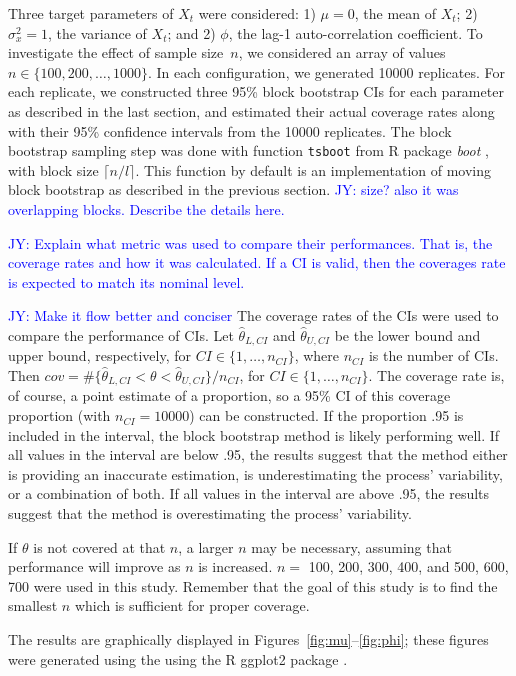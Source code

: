 \documentclass[12pt, letterpaper, titlepage]{article}
\newcommand{\jy}[1]{\textcolor{blue}{JY: #1}}
\begin{document}
Three target parameters of $X_t$ were considered:
1) $\mu = 0$, the mean of $X_t$;
2) $\sigma_x^2 = 1$, the variance of $X_t$; and
2) $\phi$, the lag-1 auto-correlation coefficient.
To investigate the effect of sample size~$n$, we considered an array of values
$n \in \{100, 200, \ldots, 1000\}$. In each configuration, we generated 10000
replicates. For each replicate, we constructed three 95\% block bootstrap
CIs for each parameter as described in the last section, and
estimated their actual coverage rates along with their 95\% confidence
intervals from the 10000 replicates. The block bootstrap sampling step was done
with function \texttt{tsboot} from R package \textsl{boot} \citep{boot}, with
block size $\lceil n / l \rceil$. This function by default is an implementation
of moving block bootstrap as described in the previous section.
\jy{size? also it was overlapping blocks. Describe the details here.}


\jy{Explain what metric was used to compare their performances. That is, the
  coverage rates and how it was calculated. If a CI is valid, then the coverages
  rate is expected to match its nominal level.}

\jy{Make it flow better and conciser}
The coverage rates of the CIs were used to compare the performance of CIs. Let
$\hat\theta_{L, CI}$ and $\hat\theta_{U, CI}$ be the lower bound and upper bound,
respectively,  for $CI \in \{1, \ldots, n_{CI}\}$, where $n_{CI}$ is the number of 
CIs.
Then $cov = \#\{\hat\theta_{L, CI} < \theta < \hat\theta_{U, CI} \}/n_{CI}$,  
for $CI \in \{1, \ldots, n_{CI}\}$.
The coverage rate is, of course, a
point estimate of a proportion, so a 95\% CI of this coverage
proportion (with $n_{CI} = 10000$) can be constructed. If the proportion
.95 is included in the interval, the block bootstrap method is likely
performing
well. If all values in the interval are below .95, the results suggest that the
method either is providing an inaccurate estimation, is underestimating the
process' variability, or a combination of both. If all values in the interval
are above .95, the results suggest that the method is overestimating the
process' variability.

If $\theta$ is not covered at that $n$, a larger $n$ may be
necessary, assuming that performance will improve as $n$ is increased. $n =$
100, 200, 300, 400, and 500, 600, 700 were used in this study. Remember that
the goal of this study is to find the smallest $n$ which is sufficient for
proper coverage.


The results are graphically displayed in Figures~\ref{fig:mu}--\ref{fig:phi};
these figures were generated using the using
the R ggplot2 package \citep{ggplot2}.
\end{document}
